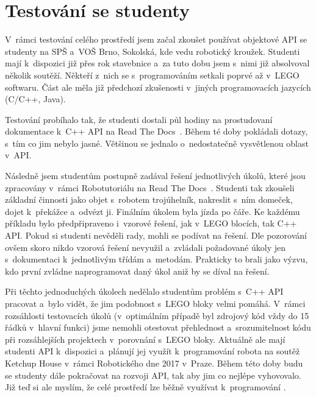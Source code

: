 \section{Testování se studenty}

V~rámci testování celého prostředí jsem začal zkoušet používat objektové API se studenty na SPŠ a~VOŠ Brno, Sokolská, kde vedu robotický kroužek.
Studenti mají k~dispozici již přes rok stavebnice \legoEV{} a~za tuto dobu jsem s~nimi již absolvoval několik soutěží. 
Někteří z~nich se s~programováním setkali poprvé až v~LEGO softwaru.
Část ale měla již předchozí zkušenosti v~jiných programovacích jazycích (C/C++, Java).

Testování probíhalo tak, že studenti dostali půl hodiny na prostudovaní dokumentace k~C++ API na Read The Docs~\cite{readthedocs}. 
Během té doby pokládali dotazy, s~tím co jim nebylo jasné. 
Většinou se jednalo o~nedostatečně vysvětlenou oblast v~API. 

Následně jsem studentům postupně zadával řešení jednotlivých úkolů, které jsou zpracovány v~rámci Robotutoriálu  na Read The Docs~\cite{readthedocs}.
Studenti tak zkoušeli základní činnosti jako objet s~robotem trojúhelník, nakreslit s~ním domeček, dojet k~překážce  a~odvézt ji. 
Finálním úkolem byla jízda po čáře.
Ke každému příkladu bylo předpřipraveno i~vzorové řešení, jak v~LEGO blocích, tak C++ API.
Pokud si studenti nevěděli rady, mohli se podívat na řešení. 
Dle pozorování ovšem skoro nikdo vzorová řešení nevyužil a~zvládali požadované úkoly jen s~dokumentaci k~jednotlivým třídám a~metodám.
Prakticky to brali jako výzvu, kdo první zvládne naprogramovat daný úkol aniž by se díval na řešení.

Při těchto jednoduchých úkolech nedělalo studentům problém s~C++ API pracovat a~bylo vidět, že jim podobnost s~LEGO bloky velmi pomáhá.
V~rámci rozsáhlosti testovacích úkolů (v~optimálním případě byl zdrojový kód vždy do 15 řádků v~hlavní funkci) jsme nemohli otestovat přehlednost a~srozumitelnost kódu při rozsáhlejších projektech v~porovnání s~LEGO bloky.
Aktuálně ale mají studenti API k~dispozici a~plánují jej využít k~programování robota na soutěž Ketchup House v~rámci Robotického dne 2017 v~Praze.
Během této doby budu se studenty dále pokračovat na rozvoji API, tak aby jim co nejlépe vyhovovalo.
Již teď si ale myslím, že celé prostředí lze běžně využívat k~programování \legoEV{}.
